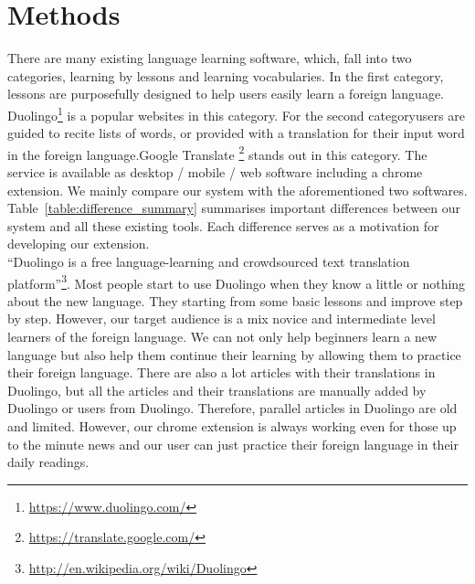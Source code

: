 \section{Methods}
There are many existing language learning software, which, fall into two categories, learning by  
lessons and learning vocabularies. In the first category, 
lessons are purposefully designed to help users easily learn a foreign language.
Duolingo\footnote{\url{https://www.duolingo.com/}} is a popular websites in this category. 
For the second categoryusers are guided to recite lists of words, or provided with a translation for their input word in the foreign language.Google Translate \footnote{\url{https://translate.google.com/}} stands out in this category. The service is available as desktop / mobile / web software including a chrome extension. We mainly compare our system  with the aforementioned two softwares.
Table~\ref{table:difference_summary} summarises important differences between 
our system and all these existing tools. Each difference serves as a motivation 
for developing our extension.
\\
``Duolingo is a free language-learning and crowdsourced text translation 
platform''\footnote{\url{http://en.wikipedia.org/wiki/Duolingo}}.
Most people start to use Duolingo when they know a little or nothing about 
the new language. They starting from some basic lessons and improve step by step.
However, our target audience 
is a mix novice and intermediate level learners of the foreign language. 
We can not only help beginners learn 
a new language but also help them continue their learning by allowing them to practice 
their foreign language. There are also a lot articles with their translations in 
Duolingo, but all the articles and their translations are manually added by 
Duolingo or users from Duolingo. Therefore, parallel articles in Duolingo are old and 
limited. However, our chrome extension is always working even for those up to the 
minute news and our user can just practice their foreign language in their daily 
readings.

